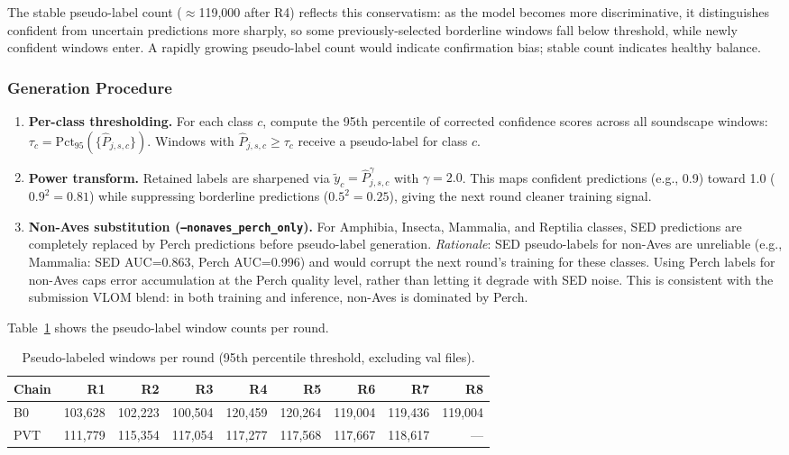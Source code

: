 \documentclass[journal]{IEEEtran}
\begin{document}
The stable pseudo-label count ($\approx$119,000 after R4) reflects this conservatism: as the model becomes more discriminative, it distinguishes confident from uncertain predictions more sharply, so some previously-selected borderline windows fall below threshold, while newly confident windows enter.
A rapidly growing pseudo-label count would indicate confirmation bias; stable count indicates healthy balance.

\subsubsection{Generation Procedure}

\begin{enumerate}
  \item \textbf{Per-class thresholding.} For each class $c$, compute the 95th percentile of corrected confidence scores across all soundscape windows: $\tau_c = \mathrm{Pct}_{95}(\{\hat{P}_{j,s,c}\})$. Windows with $\hat{P}_{j,s,c} \geq \tau_c$ receive a pseudo-label for class $c$.

  \item \textbf{Power transform.} Retained labels are sharpened via $\tilde{y}_c = \hat{P}_{j,s,c}^{\gamma}$ with $\gamma=2.0$. This maps confident predictions (e.g., 0.9) toward 1.0 ($0.9^2=0.81$) while suppressing borderline predictions ($0.5^2=0.25$), giving the next round cleaner training signal.

  \item \textbf{Non-Aves substitution (\texttt{--nonaves\_perch\_only}).}
  For Amphibia, Insecta, Mammalia, and Reptilia classes, SED predictions are completely replaced by Perch predictions before pseudo-label generation.
  \emph{Rationale}: SED pseudo-labels for non-Aves are unreliable (e.g., Mammalia: SED AUC=0.863, Perch AUC=0.996) and would corrupt the next round's training for these classes. Using Perch labels for non-Aves caps error accumulation at the Perch quality level, rather than letting it degrade with SED noise. This is consistent with the submission VLOM blend: in both training and inference, non-Aves is dominated by Perch.
\end{enumerate}

Table~\ref{tab:pseudo} shows the pseudo-label window counts per round.

\begin{table}[t]
\centering
\caption{Pseudo-labeled windows per round (95th percentile threshold, excluding val files).}
\label{tab:pseudo}
\begin{tabular}{lrrrrrrrr}
\toprule
\textbf{Chain} & \textbf{R1} & \textbf{R2} & \textbf{R3} & \textbf{R4} & \textbf{R5} & \textbf{R6} & \textbf{R7} & \textbf{R8} \\
\midrule
B0  & 103,628 & 102,223 & 100,504 & 120,459 & 120,264 & 119,004 & 119,436 & 119,004 \\
PVT & 111,779 & 115,354 & 117,054 & 117,277 & 117,568 & 117,667 & 118,617 & --- \\
\bottomrule
\end{tabular}
\end{table}
\end{document}
